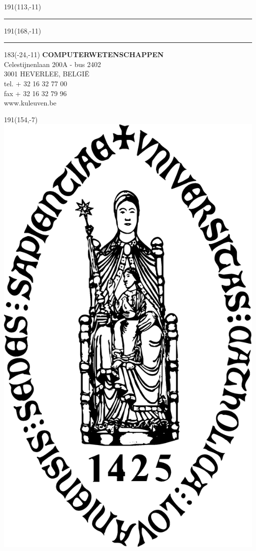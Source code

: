 \documentclass[12pt,a4paper,oneside]{book}
\begin{document}
{%
\thispagestyle{empty}
\sffamily
%
\begin{textblock}{191}(113,-11)
{\color{blueline}\rule{160pt}{5.5pt}}
\end{textblock}
%
\begin{textblock}{191}(168,-11)
{\color{blueline}\rule{5.5pt}{59pt}}
\end{textblock}
%
\begin{textblock}{183}(-24,-11)
\textblockcolour{}
\flushright
\fontsize{7}{7.5}\selectfont
\textbf{COMPUTERWETENSCHAPPEN}\\
Celestijnenlaan 200A - bus 2402\\
3001 HEVERLEE, BELGI\"{E}\\
tel. + 32 16 32 77 00\\
fax + 32 16 32 79 96\\
www.kuleuven.be\\
\end{textblock}
%
\begin{textblock}{191}(154,-7)
\textblockcolour{}
\includegraphics*[height=16.5truemm]{sedes.png}

\end{textblock}}
\end{document}
